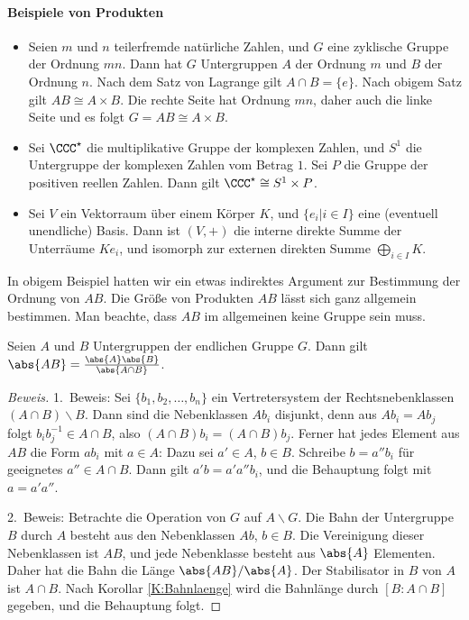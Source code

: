 \documentclass[12pt,a4paper,twoside]{article}
\begin{document}
\paragraph{Beispiele von Produkten}
\begin{itemize}
\item Seien $m$ und $n$ teilerfremde nat\"urliche Zahlen, und $G$ eine
  zyklische Gruppe der Ordnung $mn$. Dann hat $G$ Untergruppen $A$ der Ordnung
  $m$ und $B$ der Ordnung $n$. Nach dem Satz von Lagrange gilt $A\cap
  B=\{e\}$. Nach obigem Satz gilt $AB\cong A\times B$. Die rechte Seite hat
  Ordnung $mn$, daher auch die linke Seite und es folgt $G=AB\cong A\times
  B$.
\item Sei $\CCC^\star$ die multiplikative Gruppe der komplexen Zahlen, und
  $S^1$ die Untergruppe der komplexen Zahlen vom Betrag $1$. Sei $P$ die
  Gruppe der positiven reellen Zahlen. Dann gilt $\CCC^\star\cong S^1\times
  P$.
\item Sei $V$ ein Vektorraum \"uber einem K\"orper $K$, und $\{e_i|i\in I\}$
  eine (eventuell unendliche) Basis. Dann ist $(V,+)$ die interne direkte
  Summe der Unterr\"aume $Ke_i$, und isomorph zur externen direkten Summe
  $\bigoplus_{i\in I}K$.
\end{itemize}
In obigem Beispiel hatten wir ein etwas indirektes Argument zur Bestimmung der
Ordnung von $AB$. Die Gr\"o\ss e von Produkten $AB$ l\"asst sich ganz
allgemein bestimmen. Man beachte, dass $AB$ im allgemeinen keine Gruppe sein
muss.
\begin{Satz}
  Seien $A$ und $B$ Untergruppen der endlichen Gruppe $G$. Dann gilt
  $\abs{AB}=\frac{\abs{A}\abs{B}}{\abs{A\cap B}}$.
\end{Satz}
\begin{proof}[Beweis]
  1.\ Beweis: Sei $\{b_1,b_2,\dots,b_n\}$ ein Vertretersystem der
  Rechtsnebenklassen $(A\cap B)\backslash B$. Dann sind die Nebenklassen
  $Ab_i$ disjunkt, denn aus $Ab_i=Ab_j$ folgt $b_ib_j^{-1}\in A\cap B$, also
  $(A\cap B)b_i=(A\cap B)b_j$. Ferner hat jedes Element aus $AB$ die Form
  $ab_i$ mit $a\in A$: Dazu sei $a'\in A$, $b\in B$. Schreibe $b=a''b_i$ f\"ur
  geeignetes $a''\in A\cap B$. Dann gilt $a'b=a'a''b_i$, und die Behauptung
  folgt mit $a=a'a''$.
    
  2.\ Beweis: Betrachte die Operation von $G$ auf $A\backslash G$. Die Bahn
  der Untergruppe $B$ durch $A$ besteht aus den Nebenklassen $Ab$, $b\in B$.
  Die Vereinigung dieser Nebenklassen ist $AB$, und jede Nebenklasse besteht
  aus $\abs{A}$ Elementen. Daher hat die Bahn die L\"ange $\abs{AB}/\abs{A}$.
  Der Stabilisator in $B$ von $A$ ist $A\cap B$. Nach Korollar
  \ref{K:Bahnlaenge} wird die Bahnl\"ange durch $[B:A\cap B]$ gegeben, und die
  Behauptung folgt.
\end{proof}
\end{document}
